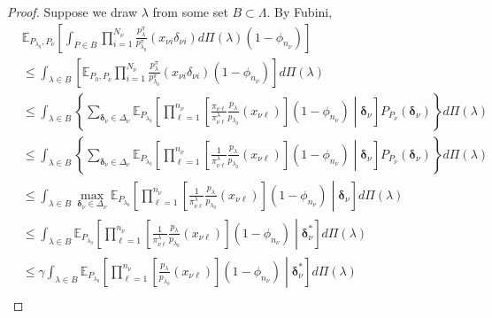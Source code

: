 \documentclass[]{imsart}
\begin{document}
\begin{proof}
Suppose we draw $\lambda$ from some set $B \subset \Lambda$.  By Fubini,
\begin{align}
&\mathbb{E}_{P_{\lambda_{0}},P_{\nu}}\left[\mathop{\int}_{P\in B}\mathop{\prod}_{i=1}^{N_{\nu}}
\frac{p_{\lambda}^{\pi}}{p_{\lambda_{0}}^{\pi}}\left(x_{\nu i}\delta_{\nu i}\right)d\Pi\left(\lambda\right)\left(1-\phi_{n_{\nu}}\right)\right] \nonumber\\
&\leq \mathop{\int}_{\lambda\in B}\left[\mathbb{E}_{P_{0},P_{\nu}}\mathop{\prod}_{i=1}^{N_{\nu}}
\frac{p_{\lambda}^{\pi}}{p_{\lambda_{0}}^{\pi}}\left(x_{\nu i}\delta_{\nu i}\right)\left(1-\phi_{n_{\nu}}\right)\right]d\Pi\left(\lambda\right)\\
&\leq \mathop{\int}_{\lambda\in B}
\left\{\displaystyle\mathop{\sum}_{\bm{\delta}_{\nu}\in\Delta_{\nu}}\mathbb{E}_{P_{\lambda_{0}}}\left[\mathop{\prod}_{\ell=1}^{n_{\nu}}
\left[\frac{\pi_{\nu \ell}}{\pi^{\lambda}_{\nu\ell}}\frac{p_{\lambda}}{p_{\lambda_{0}}}\left(x_{\nu\ell}\right)\right]\left(1-\phi_{n_{\nu}}\right)\middle\vert \bm{\delta}_{\nu}\right]P_{P_{\nu}}\left(\bm{\delta}_{\nu}\right)\right\}d\Pi\left(\lambda\right)\label{stepdown}\\
&\leq \mathop{\int}_{\lambda\in B}
\left\{\displaystyle\mathop{\sum}_{\bm{\delta}_{\nu}\in\Delta_{\nu}}\mathbb{E}_{P_{\lambda_{0}}}\left[\mathop{\prod}_{\ell=1}^{n_{\nu}}
\left[\frac{1}{\pi^{\lambda}_{\nu\ell}}\frac{p_{\lambda}}{p_{\lambda_{0}}}\left(x_{\nu\ell}\right)\right]\left(1-\phi_{n_{\nu}}\right)\middle\vert \bm{\delta}_{\nu}\right]P_{P_{\nu}}\left(\bm{\delta}_{\nu}\right)\right\}d\Pi\left(\lambda\right)\\
&\leq \mathop{\int}_{\lambda\in B}
\mathop{\max}_{\bm{\delta}_{\nu}\in\Delta_{\nu}}\mathbb{E}_{P_{\lambda_{0}}}\left[\mathop{\prod}_{\ell=1}^{n_{\nu}}
\left[\frac{1}{\pi^{\lambda}_{\nu\ell}}\frac{p_{\lambda}}{p_{\lambda_{0}}}\left(x_{\nu\ell}\right)\right]\left(1-\phi_{n_{\nu}}\right)\middle\vert \bm{\delta}_{\nu}\right]d\Pi\left(\lambda\right)\\
&\leq \mathop{\int}_{\lambda\in B}
\mathbb{E}_{P_{\lambda_{0}}}\left[\mathop{\prod}_{\ell=1}^{n_{\nu}}
\left[\frac{1}{\pi^{\lambda}_{\nu\ell}}\frac{p_{\lambda}}{p_{\lambda_{0}}}\left(x_{\nu\ell}\right)\right]\left(1-\phi_{n_{\nu}}\right)\middle\vert \bm{\delta}^{\ast}_{\nu}\right]d\Pi\left(\lambda\right)\\
&\leq \gamma\mathop{\int}_{\lambda\in B}
\mathbb{E}_{P_{\lambda_{0}}}\left[\mathop{\prod}_{\ell=1}^{n_{\nu}}
\left[\frac{p_{\lambda}}{p_{\lambda_{0}}}\left(x_{\nu\ell}\right)\right]\left(1-\phi_{n_{\nu}}\right)\middle\vert \bm{\delta}^{\ast}_{\nu}\right]d\Pi\left(\lambda\right)\label{ratio}\\

\end{align}
\end{proof}
\end{document}
